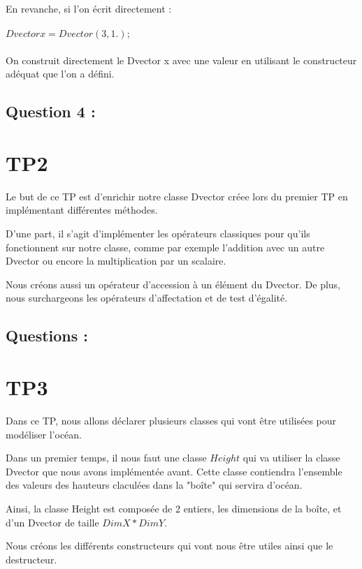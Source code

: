 \documentclass{article}
\begin{document}
En revanche, si l'on écrit directement : \\ \\ $Dvector x = Dvector(3, 1.);$ \\ \\

On construit directement le Dvector x avec une valeur en utilisant le constructeur adéquat que l'on a défini.

\subsection{Question 4 :}

\section{TP2}

Le but de ce TP est d'enrichir notre classe Dvector créee lors du premier TP en implémentant différentes méthodes.

D'une part, il s'agit d'implémenter les opérateurs classiques pour qu'ils fonctionnent sur notre classe, comme par exemple l'addition avec un autre Dvector ou encore la multiplication par un scalaire.

Nous créons aussi un opérateur d'accession à un élément du Dvector. De plus, nous surchargeons les opérateurs d'affectation et de test d'égalité.

\subsection{Questions :}


\section{TP3}

Dans ce TP, nous allons déclarer plusieurs classes qui vont être utilisées pour modéliser l'océan.

Dans un premier temps, il nous faut une classe $Height$ qui va utiliser la classe Dvector que nous avons implémentée avant. Cette classe contiendra l'ensemble des valeurs des hauteurs claculées dans la "boîte" qui servira d'océan.

Ainsi, la classe Height est composée de 2 entiers, les dimensions de la boîte, et d'un Dvector de taille $DimX * DimY$.

Nous créons les différents constructeurs qui vont nous être utiles ainsi que le destructeur.
\end{document}
